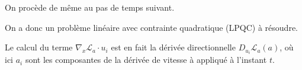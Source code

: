 \documentclass{article}
\newcommand{\bv}{\bm{v}}
\newcommand{\norm}[1]{\left\lVert #1 \right\rVert}
\begin{document}
On procède de même au pas de temps suivant.

On a donc un problème linéaire avec contrainte quadratique (LPQC) à résoudre.

Le calcul du terme $\nabla_x \mathcal L_a \cdot u_i$ est en fait la dérivée directionnelle $D_{u_i} \mathcal L_a(a)$, où ici $a_i$ sont les composantes de la dérivée de vitesse à appliqué à l'instant $t$.
























\end{document}
